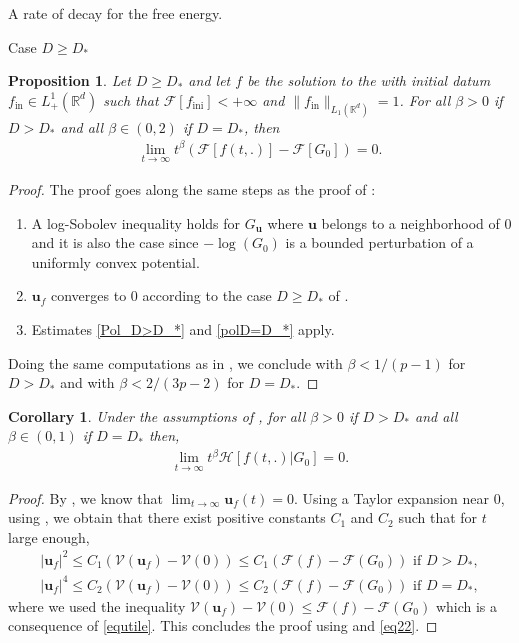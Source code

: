 \documentclass[reqno]{amsart} %
\newtheorem{proposition}{Proposition}[section]
\newtheorem{corollary}{Corollary}[section]
\begin{document}
\begin{section}{A rate of decay for the free energy.}
\begin{subsection}{Case \texorpdfstring{$D\geq D_*$}{DD*}}
\begin{proposition}
\label{prop2}
Let $D\geq D_*$ and
    let $f$ be the solution to the  with initial datum \mbox{~$f_{\mathrm{in}} \in L^1_+(\mathbb{R}^d)$}  such that $\mathcal{F}[f_{\mathrm{ini
    }}]<+\infty$ and $\|f_{\mathrm{in}} \|_{L_1(\mathbb{R}^d)}=1$.
    For all $\beta >0$ if $D>D_*$ and all $\beta \in (0,2)$ if $D=D_*$, then
    \begin{align*}
        \lim_{t\rightarrow \infty }t^{\beta}\left(\mathcal{F}[f(t,.)]-\mathcal{F}[G_0]\right)=0.
    \end{align*}
\end{proposition}
\begin{proof}
    The proof goes along the same steps as the proof of :
    \begin{enumerate}
    \item A log-Sobolev inequality holds for $G_\mathbf{u}$ where $\mathbf{u} $ belongs to a neighborhood of $0$ and it is also the case since $-\log(G_0)$ is a bounded perturbation of a uniformly convex potential.
    \item $\mathbf{u}_{f} $ converges to $0$ according to the case  $D\geq D_*$ of .
    \item Estimates \eqref{Pol_D>D_*} and \eqref{polD=D_*} apply. 
\end{enumerate}
Doing the same computations as in , we conclude with $\beta< 1/(p-1)$ for $D>D_*$ and with $\beta< 2/(3p-2) $ for $D=D_*$.
\end{proof}

\begin{corollary}
    Under the assumptions of , for all $\beta>0$ if $D>D_*$ and all $\beta \in (0,1)$ if $D=D_*$ then, 
    \begin{align*}
        \lim_{t\rightarrow \infty}t^{\beta} \mathcal{H}[f(t,.)|G_0]=0.
    \end{align*}
\end{corollary}
\begin{proof}
 By , we know that $\lim_{t \rightarrow \infty}\mathbf{u}_{f}(t)=0$. Using a Taylor expansion near $0$, using , we obtain that there exist positive constants $C_1$ and $C_2$ such that for $t $ large enough, 
  \begin{align*}
      |\mathbf{u}_{f}|^2\leq  C_1\left(\mathcal{V}(\mathbf{u}_{f})-\mathcal{V}(0) \right)\leq C_1\left(\mathcal{F}(f)-\mathcal{F}(G_0) \right)  \text{ if } D>D_*,
  \end{align*} 
\begin{align*}
    |\mathbf{u}_{f}|^4 \leq  C_2\left(\mathcal{V}(\mathbf{u}_{f})-\mathcal{V}(0) \right)\leq C_2\left(\mathcal{F}(f)-\mathcal{F}(G_0) \right) \text{ if } D=D_*,
\end{align*}
where we used the inequality $\mathcal{V}(\mathbf{u}_{f})-\mathcal{V}(0)\leq \mathcal{F}(f)-\mathcal{F}(G_0)$ which is a consequence of \eqref{equtile}.
This concludes the proof using  and \eqref{eq22}.
\end{proof}



\end{subsection}
\end{section}
\end{document}
